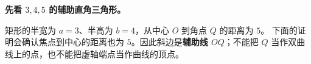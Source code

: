 \begin{explanationbox}
\textbf{先看 $3,4,5$ 的辅助直角三角形。}

矩形的半宽为 $a=3$、半高为 $b=4$，从中心 $O$ 到角点 $Q$ 的距离为 $5$。
下面的证明会确认焦点到中心的距离也为 $5$。因此斜边是\textbf{辅助线 $OQ$}；不能把 $Q$ 当作双曲线上的点，也不能把虚轴端点当作曲线的顶点。
\end{explanationbox}
\clearpage
